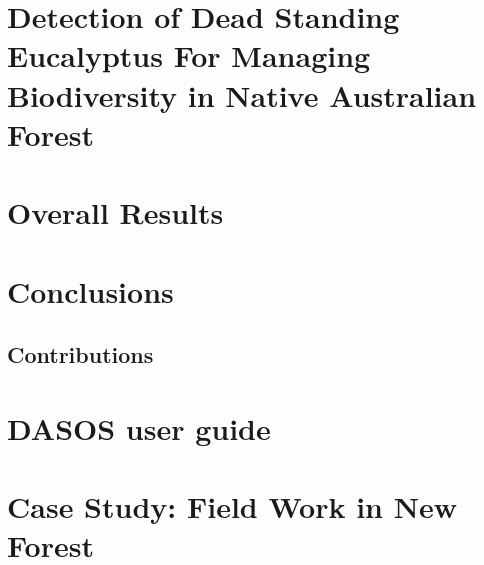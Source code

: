 \documentclass[11pt,nofootinbib]{report}
\begin{document}
	\chapter{Detection of Dead Standing Eucalyptus For Managing Biodiversity in Native Australian Forest}\label{Classifications}
		
		\newpage
	\chapter{Overall Results}\label{Results}
		
		\newpage
	\chapter{Conclusions}\label{Conclusions}
		
		\newpage
		\section{Contributions}\label{Contributions}
		
		
	    
	    {}
        \newpage

   \setcounter{secnumdepth}{4}
  
   	
		\newpage
		\appendix
	\chapter{DASOS user guide}\label{NULL}
		\thispagestyle{empty}
		\newpage
		
	\chapter{Case Study: Field Work in New Forest}\label{Fieldwork}
		 
		\newpage
	

    
\end{document}
